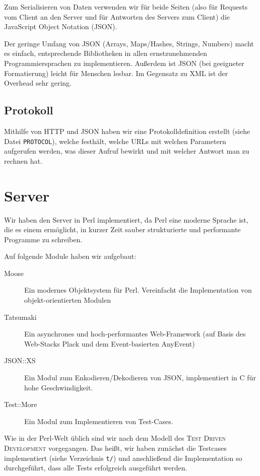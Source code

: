 \documentclass[12pt, a4paper]{scrartcl}
\begin{document}
Zum Serialisieren von Daten verwenden wir für beide Seiten (also für Requests
vom Client an den Server und für Antworten des Servers zum Client) die
JavaScript Object Notation (JSON).
\np

Der geringe Umfang von JSON (Arrays, Maps/Hashes, Strings, Numbers) macht es
einfach, entsprechende Bibliotheken in allen ernstzunehmenden
Programmiersprachen zu implementieren. Außerdem ist JSON (bei geeigneter
Formatierung) leicht für Menschen lesbar. Im Gegensatz zu XML ist der Overhead
sehr gering.

\subsection{Protokoll}

Mithilfe von HTTP und JSON haben wir eine Protokolldefinition erstellt (siehe
Datei \texttt{PROTOCOL}), welche festhält, welche URLs mit welchen Parametern
aufgerufen werden, was dieser Aufruf bewirkt und mit welcher Antwort man zu
rechnen hat.

\clearpage

\section{Server}

Wir haben den Server in Perl implementiert, da Perl eine moderne Sprache ist,
die es einem ermöglicht, in kurzer Zeit sauber strukturierte und performante
Programme zu schreiben.
\np

Auf folgende Module haben wir aufgebaut:
\begin{description}
	\item[Moose] Ein modernes Objektsystem für Perl. Vereinfacht die
	Implementation von objekt-orientierten Modulen

	\item[Tatsumaki] Ein asynchrones und hoch-performantes Web-Framework
	(auf Basis des Web-Stacks Plack und dem Event-basierten AnyEvent)

	\item[JSON::XS] Ein Modul zum Enkodieren/Dekodieren von JSON,
	implementiert in C für hohe Geschwindigkeit.

	\item[Test::More] Ein Modul zum Implementieren von Test-Cases.
\end{description}

Wie in der Perl-Welt üblich sind wir nach dem Modell des \textsc{Test Driven
Development} vorgegangen. Das heißt, wir haben zunächst die Testcases
implementiert (siehe Verzeichnis \texttt{t/}) und anschließend die
Implementation so durchgeführt, dass alle Tests erfolgreich ausgeführt werden.
\np
\end{document}
